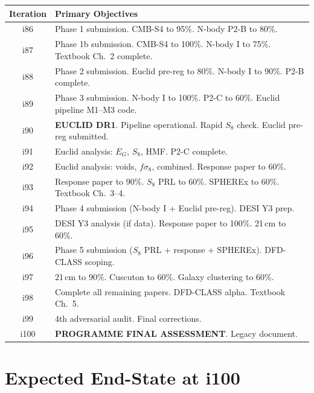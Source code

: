 \documentclass[11pt,a4paper]{article}
\begin{document}
\begin{center}
\begin{longtable}{cl}
\toprule
\textbf{Iteration} & \textbf{Primary Objectives} \\
\midrule
\endhead
i86 & Phase 1 submission. CMB-S4 to 95\%. N-body P2-B to 80\%. \\
i87 & Phase 1b submission. CMB-S4 to 100\%. N-body I to 75\%. Textbook Ch.\ 2 complete. \\
i88 & Phase 2 submission. Euclid pre-reg to 80\%. N-body I to 90\%. P2-B complete. \\
i89 & Phase 3 submission. N-body I to 100\%. P2-C to 60\%. Euclid pipeline M1--M3 code. \\
i90 & \textbf{EUCLID DR1}. Pipeline operational. Rapid $S_8$ check. Euclid pre-reg submitted. \\
i91 & Euclid analysis: $E_G$, $S_8$, HMF. P2-C complete. \\
i92 & Euclid analysis: voids, $f\sigma_8$, combined. Response paper to 60\%. \\
i93 & Response paper to 90\%. $S_8$ PRL to 60\%. SPHEREx to 60\%. Textbook Ch.\ 3--4. \\
i94 & Phase 4 submission (N-body I + Euclid pre-reg). DESI Y3 prep. \\
i95 & DESI Y3 analysis (if data). Response paper to 100\%. 21\,cm to 60\%. \\
i96 & Phase 5 submission ($S_8$ PRL + response + SPHEREx). DFD-CLASS scoping. \\
i97 & 21\,cm to 90\%. Cuscuton to 60\%. Galaxy clustering to 60\%. \\
i98 & Complete all remaining papers. DFD-CLASS alpha. Textbook Ch.\ 5. \\
i99 & 4th adversarial audit. Final corrections. \\
i100 & \textbf{PROGRAMME FINAL ASSESSMENT}. Legacy document. \\
\bottomrule
\end{longtable}
\end{center}

\section{Expected End-State at i100}
\end{document}
